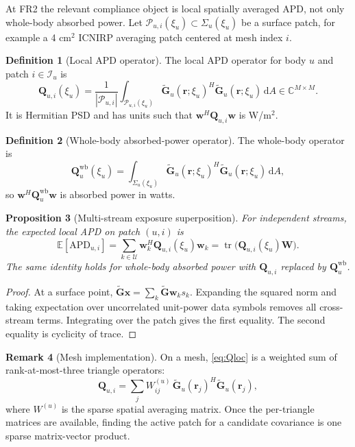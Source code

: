 \documentclass[11pt,a4paper]{article}
\theoremstyle{definition}
\newtheorem{definition}{Definition}[section]
\newtheorem{remark}[definition]{Remark}
\theoremstyle{plain}
\newtheorem{proposition}[definition]{Proposition}
\newcommand{\rr}{\mathbf r}
\newcommand{\xx}{\mathbf x}
\newcommand{\ww}{\mathbf w}
\newcommand{\W}{\mathbf W}
\newcommand{\Q}{\mathbf Q}
\newcommand{\Gtil}{\widetilde{\mathbf G}}
\newcommand{\APD}{\mathrm{APD}}
\newcommand{\Users}{\mathcal U}
\newcommand{\Patches}{\mathcal I}
\newcommand{\Complex}{\mathbb C}
\newcommand{\diff}{\mathrm d}
\newcommand{\tr}{\operatorname{tr}}
\begin{document}
At FR2 the relevant compliance object is local spatially averaged APD,
not only whole-body absorbed power.  Let
$\mathcal P_{u,i}(\xi_u)\subset\Sigma_u(\xi_u)$ be a surface patch, for
example a 4 cm$^2$ ICNIRP averaging patch centered at mesh index $i$.

\begin{definition}[Local APD operator]
The local APD operator for body $u$ and patch $i\in\Patches_u$ is
\begin{equation}\label{eq:Qloc}
  \Q_{u,i}(\xi_u)=
  \frac{1}{|\mathcal P_{u,i}|}
  \int_{\mathcal P_{u,i}(\xi_u)}
  \Gtil_u(\rr;\xi_u)^H\Gtil_u(\rr;\xi_u)\,\diff A
  \in\Complex^{M\times M}.
\end{equation}
It is Hermitian PSD and has units such that
$\ww^H\Q_{u,i}\ww$ is W/m$^2$.
\end{definition}

\begin{definition}[Whole-body absorbed-power operator]
The whole-body operator is
\begin{equation}\label{eq:Qwb}
  \Q^{\mathrm{wb}}_u(\xi_u)=
  \int_{\Sigma_u(\xi_u)}
  \Gtil_u(\rr;\xi_u)^H\Gtil_u(\rr;\xi_u)\,\diff A,
\end{equation}
so $\ww^H\Q_u^{\mathrm{wb}}\ww$ is absorbed power in watts.
\end{definition}

\begin{proposition}[Multi-stream exposure superposition]\label{prop:streams}
For independent streams, the expected local APD on patch $(u,i)$ is
\begin{equation}\label{eq:stream-superposition}
  \mathbb E[\APD_{u,i}]
  =\sum_{k\in\Users}\ww_k^H\Q_{u,i}(\xi_u)\ww_k
  =\tr\!\bigl(\Q_{u,i}(\xi_u)\W\bigr).
\end{equation}
The same identity holds for whole-body absorbed power with
$\Q_{u,i}$ replaced by $\Q_u^{\mathrm{wb}}$.
\end{proposition}

\begin{proof}
At a surface point,
$\Gtil\xx=\sum_k\Gtil\ww_k s_k$.  Expanding the squared norm and taking
expectation over uncorrelated unit-power data symbols removes all
cross-stream terms.  Integrating over the patch gives the first equality.
The second equality is cyclicity of trace.
\end{proof}

\begin{remark}[Mesh implementation]
On a mesh, \eqref{eq:Qloc} is a weighted sum of rank-at-most-three
triangle operators:
\[
  \Q_{u,i}=\sum_j W^{(u)}_{ij}\,
  \Gtil_u(\rr_j)^H\Gtil_u(\rr_j),
\]
where $W^{(u)}$ is the sparse spatial averaging matrix.  Once the
per-triangle matrices are available, finding the active patch for a
candidate covariance is one sparse matrix-vector product.
\end{remark}
\end{document}

